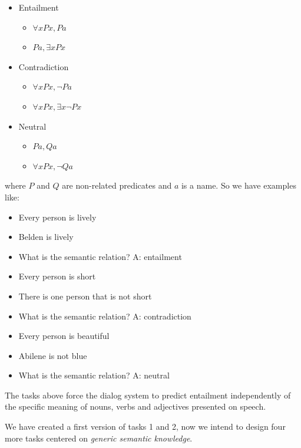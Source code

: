 \begin{itemize}
\item Entailment
\begin{itemize}
\item $\forall x Px, Pa$ 
\item $Pa, \exists x Px$ 
\end{itemize}
\item Contradiction
\begin{itemize}
\item $\forall x Px, \lnot Pa$ 
\item $\forall x Px, \exists x \lnot Px$ 
\end{itemize}
\item Neutral
\begin{itemize}
\item $Pa,Qa$
\item $\forall x Px, \lnot Qa$ 
\end{itemize}
\end{itemize}

where $P$ and $Q$ are non-related predicates and $a$ is a name. So we have examples like:

\begin{itemize} 
\item[] Every person is lively
\item[] Belden is lively
\item[] What is the semantic relation? A: entailment
\end{itemize}

\begin{itemize} 
\item[] Every person is short
\item[] There is one person that is not short
\item[] What is the semantic relation?  A: contradiction
\end{itemize}

\begin{itemize} 
\item[] Every person is beautiful
\item[] Abilene is not blue
\item[] What is the semantic relation? A: neutral
\end{itemize}


The tasks above force the dialog system to predict entailment independently of the specific meaning of nouns, verbs and adjectives presented on speech. 

We have created a first version of tasks 1 and 2, now we intend to design four more tasks centered on \textit{generic semantic knowledge}.

